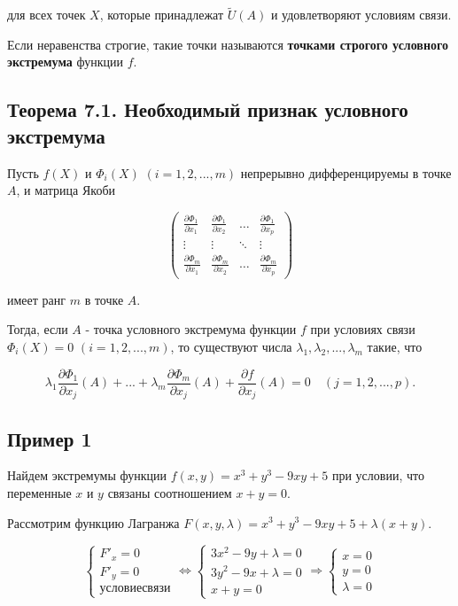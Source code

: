 {для всех точек \( X \), которые принадлежат \( \tilde{U}(A) \) и удовлетворяют условиям связи.

Если неравенства строгие, такие точки называются \textbf{точками строгого условного экстремума} функции \( f \).

\subsection*{Теорема 7.1. Необходимый признак условного экстремума}

Пусть \( f(X) \) и \( \Phi_i(X) \) \( (i=1,2,...,m) \) непрерывно дифференцируемы в точке \( A \), и матрица Якоби



\[
\begin{pmatrix}
\frac{\partial \Phi_1}{\partial x_1} & \frac{\partial \Phi_1}{\partial x_2} & \ldots & \frac{\partial \Phi_1}{\partial x_p} \\
\vdots & \vdots & \ddots & \vdots \\
\frac{\partial \Phi_m}{\partial x_1} & \frac{\partial \Phi_m}{\partial x_2} & \ldots & \frac{\partial \Phi_m}{\partial x_p}
\end{pmatrix}
\]



имеет ранг \( m \) в точке \( A \).

Тогда, если \( A \) - точка условного экстремума функции \( f \) при условиях связи \( \Phi_i(X) = 0 \) \( (i=1,2,...,m) \), то существуют числа \( \lambda_1, \lambda_2, ..., \lambda_m \) такие, что



\[
\lambda_1 \frac{\partial \Phi_1}{\partial x_j}(A) + ... + \lambda_m \frac{\partial \Phi_m}{\partial x_j}(A) + \frac{\partial f}{\partial x_j}(A) = 0 \quad (j=1,2,...,p).
\]




\subsection*{Пример 1}

Найдем экстремумы функции \( f(x, y) = x^3 + y^3 - 9xy + 5 \) при условии, что переменные \( x \) и \( y \) связаны соотношением \( x + y = 0 \).

Рассмотрим функцию Лагранжа \( F(x, y, \lambda) = x^3 + y^3 - 9xy + 5 + \lambda (x + y) \).



\[
\begin{cases}
F'_x = 0 \\
F'_y = 0 \\
условие связи
\end{cases}
\Leftrightarrow
\begin{cases}
3x^2 - 9y + \lambda = 0 \\
3y^2 - 9x + \lambda = 0 \\
x + y = 0
\end{cases}
\Rightarrow
\begin{cases}
x = 0 \\
y = 0 \\
\lambda = 0
\end{cases}
\]



}
